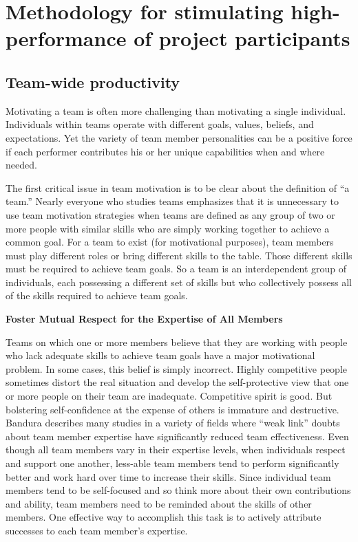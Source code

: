 \chapter{Methodology for stimulating high-performance of project participants}
\label{chap:building}

\section{Team-wide productivity}

Motivating a team is often more challenging than motivating a single individual. Individuals within teams operate with different goals, values, beliefs, and expectations. Yet the variety of team member personalities can be a positive force if each performer contributes his or her unique capabilities when and where needed.

The first critical issue in team motivation is to be clear about the definition of ``a team.'' Nearly everyone who studies teams emphasizes that it is unnecessary to use team motivation strategies when teams are defined as any group of two or more people with similar skills who are simply working together to achieve a common goal. For a team to exist (for motivational purposes), team members must play different roles or bring different skills to the table. Those different skills must be required to achieve team goals. So a team is an interdependent group of individuals, each possessing a different set of skills but who collectively possess all of the skills required to achieve team goals.

\textbf{Foster Mutual Respect for the Expertise of All Members}

Teams on which one or more members believe that they are working with people who lack adequate skills to achieve team goals have a major motivational problem. In some cases, this belief is simply incorrect. Highly competitive people sometimes distort the real situation and develop the self-protective view that one or more people on their team are inadequate. Competitive spirit is good. But bolstering self-confidence at the expense of others is immature and destructive. Bandura describes many studies in a variety of fields where ``weak link'' doubts about team member expertise have significantly reduced team effectiveness. Even though all team members vary in their expertise levels, when individuals respect and support one another, less-able team members tend to perform significantly better and work hard over time to increase their skills. Since individual team members tend to be self-focused and so think more about their own contributions and ability, team members need to be reminded about the skills of other members. One effective way to accomplish this task is to actively attribute successes to each team member’s expertise.

